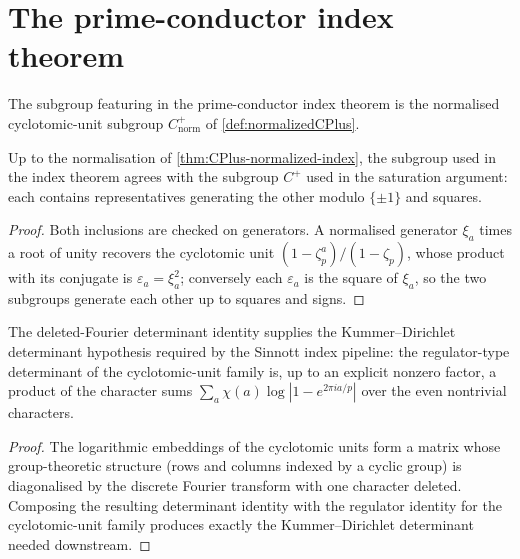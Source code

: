 \section{The prime-conductor index theorem}

\begin{definition}\label{def:cyclotomicUnitIndexSubgroup}
  \leanok
The subgroup featuring in the prime-conductor index theorem is the
normalised cyclotomic-unit subgroup $C^+_{\mathrm{norm}}$ of
\cref{def:normalizedCPlus}.
\end{definition}

\begin{theorem}\label{thm:index-subgroup-eq-CPlus}
  \leanok
Up to the normalisation of \cref{thm:CPlus-normalized-index}, the subgroup
used in the index theorem agrees with the subgroup $C^+$ used in the
saturation argument: each contains representatives generating the other
modulo $\{\pm1\}$ and squares.
\end{theorem}
\begin{proof}\leanok
Both inclusions are checked on generators.  A normalised generator $\xi_a$
times a root of unity recovers the cyclotomic unit
$(1-\zeta_p^a)/(1-\zeta_p)$, whose product with its conjugate is
$\varepsilon_a = \xi_a^2$; conversely each $\varepsilon_a$ is the square of
$\xi_a$, so the two subgroups generate each other up to squares and signs.
\end{proof}

\begin{theorem}\label{thm:deleted-fourier-kummer-dirichlet}
  \leanok
The deleted-Fourier determinant identity supplies the Kummer--Dirichlet
determinant hypothesis required by the Sinnott index pipeline: the
regulator-type determinant of the cyclotomic-unit family is, up to an
explicit nonzero factor, a product of the character sums
$\sum_a \chi(a) \log|1-e^{2\pi i a/p}|$ over the even nontrivial
characters.
\end{theorem}
\begin{proof}\leanok
The logarithmic embeddings of the cyclotomic units form a matrix whose
group-theoretic structure (rows and columns indexed by a cyclic group) is
diagonalised by the discrete Fourier transform with one character deleted.
Composing the resulting determinant identity with the regulator identity
for the cyclotomic-unit family produces exactly the Kummer--Dirichlet
determinant needed downstream.
\end{proof}

